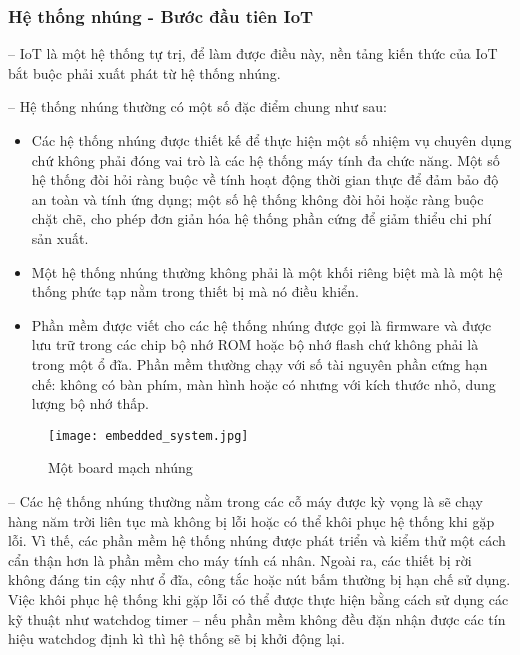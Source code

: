 	\subsubsection{Hệ thống nhúng - Bước đầu tiên IoT}
	-- IoT là một hệ thống tự trị, để làm được điều này, nền tảng kiến thức của IoT bắt buộc phải xuất phát từ hệ thống nhúng. 
	
	-- Hệ thống nhúng thường có một số đặc điểm chung như sau:
\begin{itemize}
		\item Các hệ thống nhúng được thiết kế để thực hiện một số nhiệm vụ chuyên dụng chứ không phải đóng vai trò là các hệ thống máy tính đa chức năng. Một số hệ thống đòi hỏi ràng buộc về tính hoạt động thời gian thực để đảm bảo độ an toàn và tính ứng dụng; một số hệ thống không đòi hỏi hoặc ràng buộc chặt chẽ, cho phép đơn giản hóa hệ thống phần cứng để giảm thiểu chi phí sản xuất.
		
		\item Một hệ thống nhúng thường không phải là một khối riêng biệt mà là một hệ thống phức tạp nằm trong thiết bị mà nó điều khiển.
		
		\item Phần mềm được viết cho các hệ thống nhúng được gọi là firmware và được lưu trữ trong các chip bộ nhớ ROM hoặc bộ nhớ flash chứ không phải là trong một ổ đĩa. Phần mềm thường chạy với số tài nguyên phần cứng hạn chế: không có bàn phím, màn hình hoặc có nhưng với kích thước nhỏ, dung lượng bộ nhớ thấp.
\end{itemize}

\begin{figure}[H]
	\centering
	\texttt{[image: embedded\_system.jpg]}
	\caption{Một board mạch nhúng}
\end{figure}

	-- Các hệ thống nhúng thường nằm trong các cỗ máy được kỳ vọng là sẽ chạy hàng năm trời liên tục mà không bị lỗi hoặc có thể khôi phục hệ thống khi gặp lỗi. Vì thế, các phần mềm hệ thống nhúng được phát triển và kiểm thử một cách cẩn thận hơn là phần mềm cho máy tính cá nhân. Ngoài ra, các thiết bị rời không đáng tin cậy như ổ đĩa, công tắc hoặc nút bấm thường bị hạn chế sử dụng. Việc khôi phục hệ thống khi gặp lỗi có thể được thực hiện bằng cách sử dụng các kỹ thuật như watchdog timer – nếu phần mềm không đều đặn nhận được các tín hiệu watchdog định kì thì hệ thống sẽ bị khởi động lại.
	
